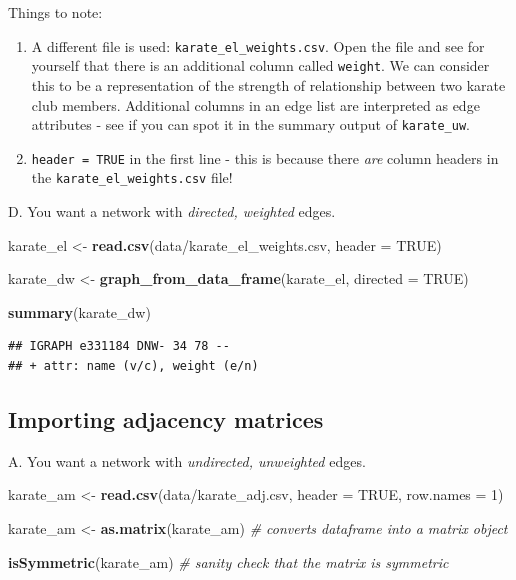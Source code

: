 \documentclass[
]{book}
\newenvironment{Shaded}{\begin{snugshade}}{\end{snugshade}}
\newcommand{\AttributeTok}[1]{\textcolor[rgb]{0.13,0.29,0.53}{#1}}
\newcommand{\CommentTok}[1]{\textcolor[rgb]{0.56,0.35,0.01}{\textit{#1}}}
\newcommand{\ConstantTok}[1]{\textcolor[rgb]{0.56,0.35,0.01}{#1}}
\newcommand{\DecValTok}[1]{\textcolor[rgb]{0.00,0.00,0.81}{#1}}
\newcommand{\FunctionTok}[1]{\textcolor[rgb]{0.13,0.29,0.53}{\textbf{#1}}}
\newcommand{\NormalTok}[1]{#1}
\newcommand{\OtherTok}[1]{\textcolor[rgb]{0.56,0.35,0.01}{#1}}
\newcommand{\StringTok}[1]{\textcolor[rgb]{0.31,0.60,0.02}{#1}}
\providecommand{\tightlist}{%
  \setlength{\itemsep}{0pt}\setlength{\parskip}{0pt}}
\begin{document}
Things to note:

\begin{enumerate}
\def\labelenumi{\arabic{enumi}.}
\tightlist
\item
  A different file is used: \texttt{karate\_el\_weights.csv}. Open the file and see for yourself that there is an additional column called \texttt{weight}. We can consider this to be a representation of the strength of relationship between two karate club members. Additional columns in an edge list are interpreted as edge attributes - see if you can spot it in the summary output of \texttt{karate\_uw}.
\item
  \texttt{header\ =\ TRUE} in the first line - this is because there \emph{are} column headers in the \texttt{karate\_el\_weights.csv} file!
\end{enumerate}

D. You want a network with \emph{directed, weighted} edges.

\begin{Shaded}
\begin{Highlighting}[]
\NormalTok{karate\_el }\OtherTok{\textless{}{-}} \FunctionTok{read.csv}\NormalTok{(}\StringTok{\textquotesingle{}data/karate\_el\_weights.csv\textquotesingle{}}\NormalTok{, }\AttributeTok{header =} \ConstantTok{TRUE}\NormalTok{)}

\NormalTok{karate\_dw }\OtherTok{\textless{}{-}} \FunctionTok{graph\_from\_data\_frame}\NormalTok{(karate\_el, }\AttributeTok{directed =} \ConstantTok{TRUE}\NormalTok{)}

\FunctionTok{summary}\NormalTok{(karate\_dw)}
\end{Highlighting}
\end{Shaded}

\begin{verbatim}
## IGRAPH e331184 DNW- 34 78 -- 
## + attr: name (v/c), weight (e/n)
\end{verbatim}

\subsection{Importing adjacency matrices}\label{importing-adjacency-matrices}

A. You want a network with \emph{undirected, unweighted} edges.

\begin{Shaded}
\begin{Highlighting}[]
\NormalTok{karate\_am }\OtherTok{\textless{}{-}} \FunctionTok{read.csv}\NormalTok{(}\StringTok{\textquotesingle{}data/karate\_adj.csv\textquotesingle{}}\NormalTok{, }\AttributeTok{header =} \ConstantTok{TRUE}\NormalTok{, }\AttributeTok{row.names =} \DecValTok{1}\NormalTok{)}

\NormalTok{karate\_am }\OtherTok{\textless{}{-}} \FunctionTok{as.matrix}\NormalTok{(karate\_am) }\CommentTok{\# converts dataframe into a matrix object}

\FunctionTok{isSymmetric}\NormalTok{(karate\_am) }\CommentTok{\# sanity check that the matrix is symmetric }
\end{Highlighting}
\end{Shaded}
\end{document}
